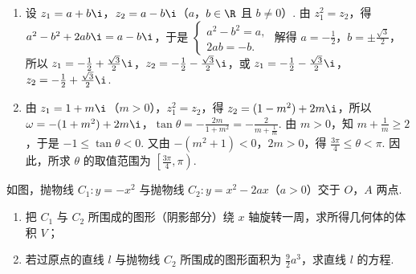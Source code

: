 \begin{solution}
\begin{enumerate}
\item 设 \(z_1=a+b\i\)，\(z_2=a-b\i\)（\(a\)，\(b \in \R\) 且 \(b \neq 0\)）. 由 \(z_1^2=z_2\)，得 \(a^2-b^2+2ab\i=a-b\i\)，于是 \(\begin{cases}
a^2-b^2=a,\\
2ab=-b.
\end{cases}\) 解得 \(a=-\frac{1}{2}\)，\(b=\pm\frac{\sqrt{3}}{2}\)，所以 \(z_1=-\frac{1}{2}+\frac{\sqrt{3}}{2}\i\)，\(z_2=-\frac{1}{2}-\frac{\sqrt{3}}{2}\i\)，或 \(z_1=-\frac{1}{2}-\frac{\sqrt{3}}{2}\i\)，\(z_2=-\frac{1}{2}+\frac{\sqrt{3}}{2}\i\).

\item 由 \(z_1=1+m\i\)（\(m>0\)），\(z_1^2=z_2\)，得 \(z_2=(1-m^2)+2m\i\)，所以 \(\omega=-(1+m^2)+2m\i\)，\(\tan \theta=-\frac{2m}{1+m^2}=-\frac{2}{m+\frac{1}{m}}\). 由 \(m>0\)，知 \(m+\frac{1}{m} \geqslant 2\)，于是 \(-1 \leqslant \tan \theta < 0\). 又由 \(-(m^2+1)<0\)，\(2m>0\)，得 \(\frac{3\pi}{4} \leqslant \theta < \pi\). 因此，所求 \(\theta\) 的取值范围为 \(\left[\frac{3\pi}{4}, \pi\right)\).
\end{enumerate}
\end{solution}

\reuseproblemnumber
\begin{problem}[B]
如图，抛物线 \(C_1:y=-x^2\) 与抛物线 \(C_2:y=x^2-2ax\)（\(a>0\)）交于 \(O\)，\(A\) 两点.
\begin{enumerate}
\item 把 \(C_1\) 与 \(C_2\) 所围成的图形（阴影部分）绕 \(x\) 轴旋转一周，求所得几何体的体积 \(V\)；
\item 若过原点的直线 \(l\) 与抛物线 \(C_2\) 所围成的图形面积为 \(\frac{9}{2}a^3\)，求直线 \(l\) 的方程.
\end{enumerate}

\end{problem}

